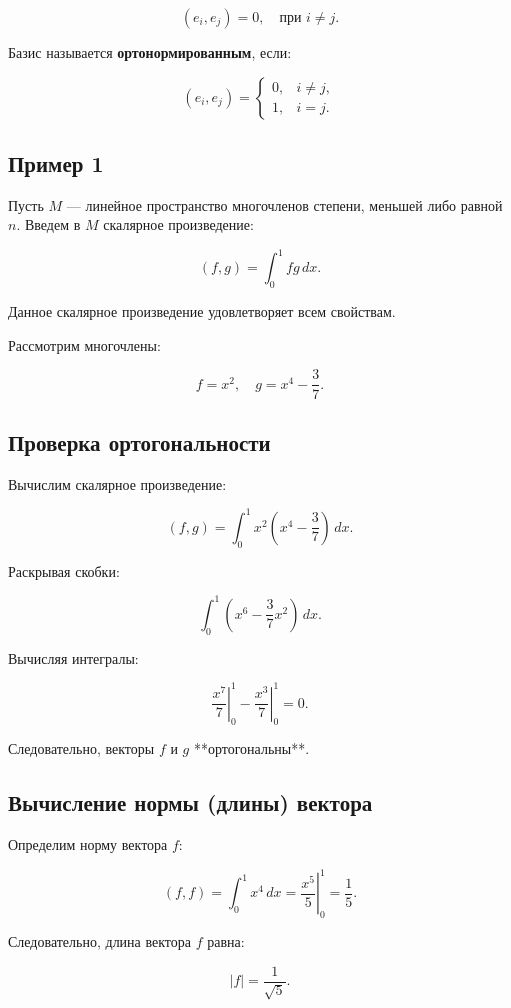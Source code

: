 {\[
(e_i, e_j) = 0, \quad \text{при } i \neq j.
\]

Базис называется \textbf{ортонормированным}, если:

\[
(e_i, e_j) = 
\begin{cases} 
0, & i \neq j, \\ 
1, & i = j. 
\end{cases}
\]

\subsection*{Пример 1}

Пусть \( M \) — линейное пространство многочленов степени, меньшей либо равной \( n \). Введем в \( M \) скалярное произведение:



\[
(f, g) = \int_{0}^{1} f g \, dx.
\]



Данное скалярное произведение удовлетворяет всем свойствам.

Рассмотрим многочлены:



\[
f = x^2, \quad g = x^4 - \frac{3}{7}.
\]



\subsection*{Проверка ортогональности}

Вычислим скалярное произведение:



\[
(f, g) = \int_{0}^{1} x^2 \left(x^4 - \frac{3}{7} \right) \, dx.
\]



Раскрывая скобки:



\[
\int_{0}^{1} \left( x^6 - \frac{3}{7} x^2 \right) \, dx.
\]



Вычисляя интегралы:



\[
\left. \frac{x^7}{7} \right|_{0}^{1} - \left. \frac{x^3}{7} \right|_{0}^{1} = 0.
\]



Следовательно, векторы \( f \) и \( g \) **ортогональны**.

\subsection*{Вычисление нормы (длины) вектора}

Определим норму вектора \( f \):



\[
(f, f) = \int_{0}^{1} x^4 \, dx = \left. \frac{x^5}{5} \right|_{0}^{1} = \frac{1}{5}.
\]



Следовательно, длина вектора \( f \) равна:



\[
|f| = \frac{1}{\sqrt{5}}.
\]




}